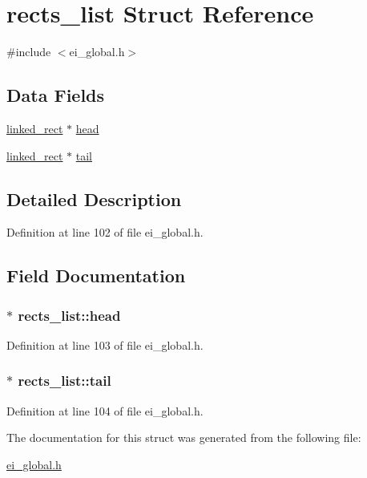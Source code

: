 \hypertarget{structrects__list}{
\section{rects\_\-list Struct Reference}
\label{structrects__list}
}


{\ttfamily \#include $<$ei\_\-global.h$>$}\subsection*{Data Fields}
\begin{DoxyCompactItemize}
\item 
\hyperlink{structlinked__rect}{linked\_\-rect} $\ast$ \hyperlink{structrects__list_acfbffd5c82981b5911abf16c18d4315b}{head}
\item 
\hyperlink{structlinked__rect}{linked\_\-rect} $\ast$ \hyperlink{structrects__list_abd3501035ec1f6cdbb06bc60701b700a}{tail}
\end{DoxyCompactItemize}


\subsection{Detailed Description}


Definition at line 102 of file ei\_\-global.h.

\subsection{Field Documentation}
\hypertarget{structrects__list_acfbffd5c82981b5911abf16c18d4315b}{
\subsubsection[{head}]{$\ast$ {\bf rects\_\-list::head}}}
\label{structrects__list_acfbffd5c82981b5911abf16c18d4315b}


Definition at line 103 of file ei\_\-global.h.\hypertarget{structrects__list_abd3501035ec1f6cdbb06bc60701b700a}{
\subsubsection[{tail}]{$\ast$ {\bf rects\_\-list::tail}}}
\label{structrects__list_abd3501035ec1f6cdbb06bc60701b700a}


Definition at line 104 of file ei\_\-global.h.

The documentation for this struct was generated from the following file:\begin{DoxyCompactItemize}
\item 
\hyperlink{ei__global_8h}{ei\_\-global.h}\end{DoxyCompactItemize}
